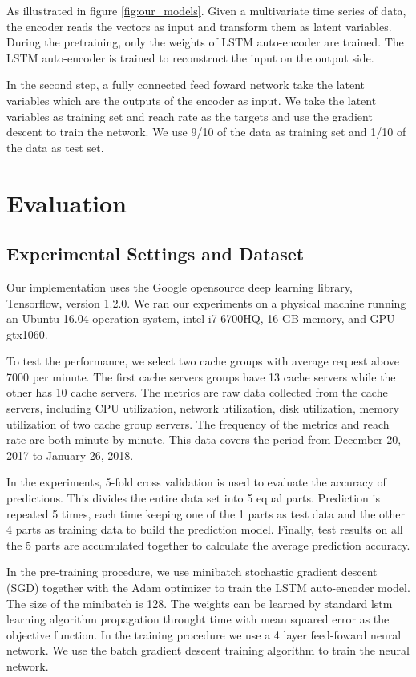 \documentclass[5p]{elsarticle}
\newcommand{\dabiaolv}{reach rate }
\begin{document}
As illustrated in figure \ref{fig:our_models}. Given a multivariate time series of data, the encoder reads the vectors as input and transform them as latent variables. During the pretraining, only the weights of LSTM auto-encoder are trained. The LSTM auto-encoder is trained to reconstruct the input on the output side. 

In the second step, a fully connected feed foward network take the latent variables which are the outputs of the encoder as input. We take the latent variables as training set and \dabiaolv as the targets and use the gradient descent to train the network. We use 9/10 of the data as training set and 1/10 of the data as test set.

\section{Evaluation}
\subsection{Experimental Settings and Dataset}
Our implementation uses the Google opensource deep learning library, Tensorflow\cite{TensorFlow}, version 1.2.0. We ran our experiments on a physical machine running an Ubuntu 16.04 operation system, intel i7-6700HQ, 16 GB memory, and GPU gtx1060.

To test the performance, we select two cache groups with average request above 7000 per minute. The first cache servers groups have 13 cache servers while the other has 10 cache servers. The metrics are raw data collected from the cache servers, including CPU utilization, network utilization, disk utilization, memory utilization of two cache group servers. The frequency of the metrics and \dabiaolv are both minute-by-minute. This data covers the period from December 20, 2017 to January 26, 2018.

In the experiments, 5-fold cross validation is used to evaluate the accuracy of predictions. This divides the entire data set into 5 equal parts.  Prediction is repeated 5 times, each time keeping one of the 1 parts as test data and the other 4 parts as training data to build the prediction model. Finally, test results on all the 5 parts are accumulated together to calculate the average prediction accuracy.

In the pre-training procedure, we use minibatch stochastic gradient descent (SGD) together with the Adam optimizer to train the LSTM auto-encoder model. The size of the minibatch is 128. The weights can be learned by standard lstm learning algorithm propagation throught time with mean squared error as the objective function. In the training procedure we use a 4 layer feed-foward neural network. We use the batch gradient descent training algorithm to train the neural network.
\end{document}
